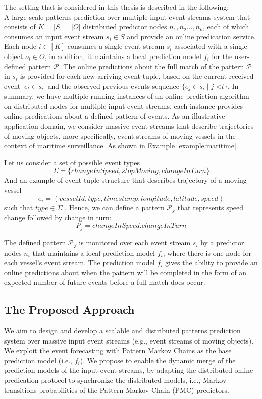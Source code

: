 \par The setting that is considered in this thesis is described in the following:\\
  A large-scale patterns prediction over multiple input event streams system that  consists of $K=\left\vert{S}\right\vert=\left\vert{O}\right\vert$ distributed predictor nodes $n_1,n_2...,n_k$, each of which consumes an input event stream $s_i\in S$ and provide an online predication service. Each node $i \in [K]$ consumes a single event stream $s_i$ associated with a single object $o_i \in O$, in addition,  it  maintains a local prediction model $f_i$ for the user-defined pattern $\mathcal{P}$. The online predictions about the full match of  the pattern $\mathcal{P}$ in $s_i$ is provided for each new arriving event tuple, based on the current received event $ \ e_t \in s_i \ $ and the observed previous events sequence $\{e_j \in s_i \mid  j \text{ <} t\}$. In summary, we have multiple running instances of an online prediction algorithm on distributed nodes for multiple input event streams, each instance  provides online predications about a defined pattern of events. As an illustrative application domain, we consider massive event streams that describe trajectories of  moving objects, more specifically, event streams of moving vessels in the context of maritime surveillance.  As shown in Example \ref{example:maritime}.
  
\begin{example} %
	Let us consider a set of possible event types
	$$\Sigma=\{changeInSpeed,stopMoving,changeInTurn\}$$
And an example of event tuple structure that describes trajectory of a moving vessel 
$$e_i=(vesselId,type,timestamp,longitude,latitude,speed)$$ such that $type \in \Sigma$   
. Hence, we can define a pattern $\mathcal{P_j}$ that represents speed change followed by change in turn:  $$P_j=changeInSpeed.changeInTurn$$
\label{example:maritime} 
\end{example}
The defined pattern $\mathcal{P_j}$ is monitored over each event stream $s_i$  by a  predictor nodes  $n_i$  that maintains a local prediction model $f_i$, where there is one node for each vessel's event stream.  The prediction model $f_i$ gives the ability to provide an online predictions about when the pattern will be completed in the form of an expected number of future events before a full match does occur.
 
 \subsection{The Proposed Approach}
 \par We aim to design and develop a scalable and distributed patterns prediction system over massive input event streams (e.g., event streams of moving objects). We  exploit the event forecasting with Pattern Markov Chains \cite{alevizos2017event} as the base prediction model (i.e., $f_i$). We propose to enable the dynamic merge of the prediction models of the input event streams, by adapting the distributed online predication protocol \cite{kamp2014communication} to synchronize the distributed  models, i.e., Markov transitions probabilities of the Pattern Markov Chain (PMC) predictors.
 
